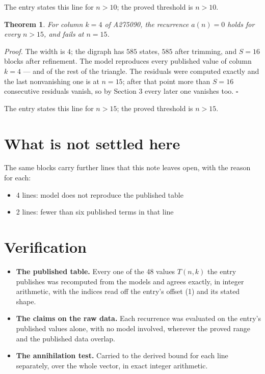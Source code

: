 \documentclass[11pt]{article}
\newtheorem{theorem}{Theorem}
\theoremstyle{definition}
\begin{document}
The entry states this line for $n > 10$; the proved threshold is $n > 10$.

\begin{theorem} For column $k = 4$ of A275090, the recurrence $a(n) = 0$ holds for every $n > 15$, and fails at $n = 15$.\end{theorem}

{\itshape Proof.} The width is $4$; the digraph has $585$ states, $585$ after trimming, and $S = 16$ blocks after refinement. The model reproduces every published value of column $k = 4$ --- and of the rest of the triangle. The residuals were computed exactly and the last nonvanishing one is at $n = 15$; after that point more than $S = 16$ consecutive residuals vanish, so by Section 3 every later one vanishes too. $\square$

The entry states this line for $n > 15$; the proved threshold is $n > 15$.

\section{What is not settled here}

The same blocks carry further lines that this note leaves open, with the reason for each:

\begin{itemize}

\item 4 lines: model does not reproduce the published table

\item 2 lines: fewer than six published terms in that line

\end{itemize}

\section{Verification}

\begin{itemize}

\item {\bfseries The published table.} Every one of the 48 values $T(n,k)$ the entry publishes was recomputed from the models and agrees exactly, in integer arithmetic, with the indices read off the entry's offset (1) and its stated shape.

\item {\bfseries The claims on the raw data.} Each recurrence was evaluated on the entry's published values alone, with no model involved, wherever the proved range and the published data overlap.

\item {\bfseries The annihilation test.} Carried to the derived bound for each line separately, over the whole vector, in exact integer arithmetic.

\end{itemize}
\end{document}
